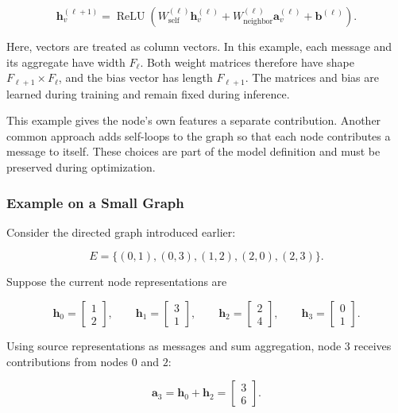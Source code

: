 \[
  \mathbf{h}_v^{(\ell+1)}
  = \operatorname{ReLU}\left(
    W_{\mathrm{self}}^{(\ell)}\mathbf{h}_v^{(\ell)}
    + W_{\mathrm{neighbor}}^{(\ell)}\mathbf{a}_v^{(\ell)}
    + \mathbf{b}^{(\ell)}\right).
\]

Here, vectors are treated as column vectors. In this example, each message and its aggregate have width $F_\ell$. Both weight matrices therefore have shape $F_{\ell+1}\times F_\ell$, and the bias vector has length $F_{\ell+1}$. The matrices and bias are learned during training and remain fixed during inference.

This example gives the node's own features a separate contribution. Another common approach adds self-loops to the graph so that each node contributes a message to itself. These choices are part of the model definition and must be preserved during optimization.

\subsubsection{Example on a Small Graph}

Consider the directed graph introduced earlier:

\[
  E=\{(0,1),(0,3),(1,2),(2,0),(2,3)\}.
\]

Suppose the current node representations are

\[
  \mathbf{h}_0=\begin{bmatrix}1\\2\end{bmatrix},
  \qquad
  \mathbf{h}_1=\begin{bmatrix}3\\1\end{bmatrix},
  \qquad
  \mathbf{h}_2=\begin{bmatrix}2\\4\end{bmatrix},
  \qquad
  \mathbf{h}_3=\begin{bmatrix}0\\1\end{bmatrix}.
\]

Using source representations as messages and sum aggregation, node $3$ receives contributions from nodes $0$ and $2$:

\[
  \mathbf{a}_3=\mathbf{h}_0+\mathbf{h}_2
  =\begin{bmatrix}3\\6\end{bmatrix}.
\]

